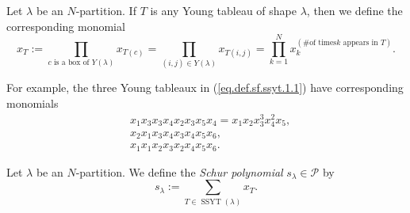 \begin{definition}
\label{def.sf.ytab.xT}Let $\lambda$ be an $N$-partition. If $T$ is any Young
tableau of shape $\lambda$, then we define the corresponding monomial%
\[
x_{T}:=\prod_{c\text{ is a box of }Y\left(  \lambda\right)  }x_{T\left(
c\right)  }=\prod_{\left(  i,j\right)  \in Y\left(  \lambda\right)
}x_{T\left(  i,j\right)  }=\prod_{k=1}^{N}x_{k}^{\left(  \text{\# of times
}k\text{ appears in }T\right)  }.
\]

\end{definition}

For example, the three Young tableaux in (\ref{eq.def.sf.ssyt.1.1}) have
corresponding monomials%
\begin{align*}
&  x_{1}x_{3}x_{3}x_{4}x_{2}x_{3}x_{5}x_{4}=x_{1}x_{2}x_{3}^{3}x_{4}^{2}%
x_{5},\\
&  x_{2}x_{1}x_{3}x_{4}x_{3}x_{4}x_{5}x_{6},\\
&  x_{1}x_{1}x_{2}x_{3}x_{2}x_{4}x_{5}x_{6}.
\end{align*}


\begin{definition}
\label{def.sf.schur}Let $\lambda$ be an $N$-partition. We define the
\emph{Schur polynomial} $s_{\lambda}\in\mathcal{P}$ by%
\[
s_{\lambda}:=\sum_{T\in\operatorname*{SSYT}\left(  \lambda\right)  }x_{T}.
\]

\end{definition}

